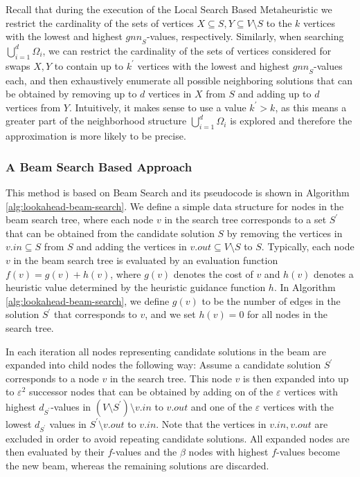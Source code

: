\documentclass[draft,final]{vutinfth} %
\begin{document}
Recall that during the execution of the Local Search Based Metaheuristic we restrict the cardinality of the sets of vertices $X \subseteq S, Y \subseteq V \setminus S$ to the $k$ vertices with the lowest and highest $\mathit{gnn}_S$-values, respectively. Similarly, when searching $\bigcup_{i=1}^d \Omega_i$, we can restrict the cardinality of the sets of vertices considered for swaps $X, Y$ to contain up to $k^\prime$ vertices with the lowest and highest $\mathit{gnn}_S$-values each, and then exhaustively enumerate all possible neighboring solutions that can be obtained by removing up to $d$ vertices in $X$ from $S$ and adding up to $d$ vertices from $Y$. Intuitively, it makes sense to use a value $k^\prime > k$, as this means a greater part of the neighborhood structure $\bigcup_{i=1}^d \Omega_i$ is explored and therefore the approximation is more likely to be precise. 

\subsubsection{A Beam Search Based Approach}

 This method is based on Beam Search and its pseudocode is shown in Algorithm \ref{alg:lookahead-beam-search}.
 We define a simple data structure for nodes in the beam search tree, where each node $v$ in the search tree corresponds to a set $S^\prime$ that can be obtained from the candidate solution $S$ by removing the vertices in $v.in \subseteq S$ from $S$ and adding the vertices in $v.out \subseteq V\setminus S$ to $S$. 
 Typically, each node $v$ in the beam search tree is evaluated by an evaluation function $f(v) = g(v) + h(v)$, where $g(v)$ denotes the cost of $v$ and $h(v)$ denotes a heuristic value determined by the heuristic guidance function $h$. In Algorithm \ref{alg:lookahead-beam-search}, we define $g(v)$ to be the number of edges in the solution $S^\prime$ that corresponds to $v$, and we set $h(v) = 0$ for all nodes in the search tree. 

In each iteration all nodes representing candidate solutions in the beam are expanded into child nodes the following way: Assume a candidate solution $S^\prime$ corresponds to a node $v$ in the search tree. This node $v$ is then expanded into up to $\varepsilon^2$ successor nodes that can be obtained by adding on of the $\varepsilon$ vertices with highest $d_{S^\prime}$-values in $(V \setminus S^\prime) \setminus v.\mathit{in}$ to $v.out$ and one of the $\varepsilon$ vertices with the lowest $d_{S^\prime}$ values in $S^\prime \setminus v.\mathit{out}$ to $v.in$. Note that the vertices in $v.in, v.out$ are excluded in order to avoid repeating candidate solutions. All expanded nodes are then evaluated by their $f$-values and the $\beta$ nodes with highest $f$-values become the new beam, whereas the remaining solutions are discarded. 
\end{document}
